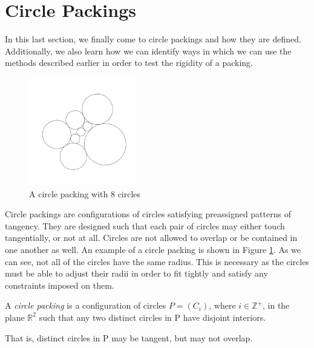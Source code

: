 
\section{Circle Packings}

\begin{flushleft}
 In this last section, we finally come to circle packings and how they are defined. Additionally, we also learn how we can identify ways in which we can use the methods described earlier in order to test the rigidity of a packing. 
\end{flushleft}

\begin{figure}[htbp]
    \centering
    \includegraphics[width = 0.42\textwidth]{Chapter 3/7. Plain packing.png}
    \caption{A circle packing with 8 circles}
    \label{fig: circle packing example}
\end{figure}
\vspace{-4 mm}
\begin{flushleft}
Circle packings are configurations of circles satisfying preassigned patterns of tangency. They are designed such that each pair of circles may either touch tangentially, or not at all. Circles are not allowed to overlap or be contained in one another as well. An example of a circle packing is shown in Figure \ref{fig: circle packing example}. As we can see, not all of the circles have the same radius. This is necessary as the circles must be able to adjust their radii in order to fit tightly and satisfy any constraints imposed on them.
\end{flushleft}

\begin{definition}
\label{def: circle packing}
A \textit{circle packing} is a configuration of circles $P = (C_i)$, where $i \in \mathbb{Z}^+$, in the plane $\mathbb{R}^2$ such that any
two distinct circles in P have disjoint interiors. 

\noindent
That is, distinct circles in P may be tangent, but may not overlap.
\end{definition}

